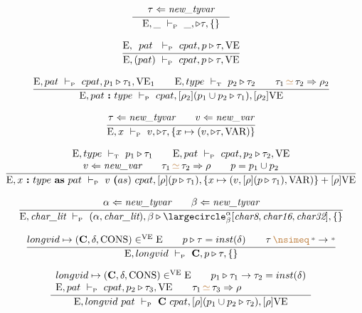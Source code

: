 \documentclass[11pt,a4paper]{article}
\newcommand{\key}[1]{\textrm{\textbf{#1}}}
\newcommand{\overld}[3]{\largecircle^{#1}_{#2}{#3}}
\newcommand{\qualtype}[2]{#1 \triangleright #2}
\newcommand{\unify}[3]{#1\,{\color{brown}{\simeq}}\,#2 \Rightarrow #3}
\newcommand{\notunifiable}[2]{#1\,{\color{brown}{\nsimeq}}\,#2}
\newcommand{\braced}[1]{\{#1\}}
\newcommand{\wildcard}{{\color{gray}\scriptstyle\textbf{*}}}
\newcommand{\litchar}{\textit{char\_lit}}
\newcommand{\Char}[1]{\textit{char#1}}
\newcommand{\Env}  {\textrm{E}}
\newcommand{\VE}   {\textrm{VE}}
\newcommand{\VKC}  {\textrm{CONS}}
\newcommand{\VKV}  {\textrm{VAR}}
\newcommand{\vcon} {\mathbf{C}}
\newcommand{\Empty}{\braced{}}
\newcommand{\vdashP}  {\ \vdash_{\textrm{\tiny P}}\  }
\newcommand{\vdashT}  {\ \vdash_{\textrm{\tiny T}}\  }
\newcommand{\corenew}[1]{\textit{new\_#1}}
\begin{document}
\[
\cfrac
 {\tau \Leftarrow \corenew{tyvar}}
 {\quad\Env, \_ \vdashP \_, \qualtype{}{\tau}, \Empty\quad}
\]

\[
\cfrac
 {\Env,\ \, pat\ \vdashP cpat,\qualtype{p}{\tau},\VE}
 {\Env,(pat) \vdashP cpat,\qualtype{p}{\tau},\VE}
\]

\[
\cfrac
 {\Env,pat \vdashP cpat,\qualtype{p_1}{\tau_1},\VE_1    \qquad
  \Env, type \vdashT \qualtype{p_2}{\tau_2}             \qquad
  \unify{\tau_1}{\tau_2}{\rho_2}}
 {\Env, pat\ \key{:}\ type \vdashP cpat, [\rho_2](\qualtype{p_1 \cup p_2}{\tau_1}), [\rho_2]\VE}
\]

\[
\cfrac
 {\tau \Leftarrow \corenew{tyvar}   \qquad
  v    \Leftarrow \corenew{var}}
 {\Env, x \vdashP v, \qualtype{}{\tau}, \braced{x \mapsto (v, \qualtype{}{\tau}, \VKV)}}
\]

\[
\cfrac
 {\begin{array}{c}
  \Env,type \vdashT \qualtype{p_1}{\tau_1}              \qquad
  \Env,pat \vdashP cpat,\qualtype{p_2}{\tau_2}, \VE     \\
  v   \Leftarrow \corenew{var}                          \qquad  
  \unify{\tau_1}{\tau_2}{\rho}                          \qquad
  p = p_1 \cup p_2
  \end{array}}
 {\Env, x\ \key{:}\ type\ \key{as}\ pat \vdashP 
    v\ \key(as)\ cpat, [\rho](\qualtype{p}{\tau_1}), \braced{x \mapsto (v, [\rho](\qualtype{p}{\tau_1}), \VKV)} + [\rho]\VE}
\]

\[
\cfrac
 {\alpha \Leftarrow \corenew{tyvar} \qquad
  \beta  \Leftarrow \corenew{tyvar}}
 {\Env, \litchar \vdashP (\alpha,\litchar), \qualtype{\beta}{\overld{\alpha}{\beta}{[\Char{8},\Char{16},\Char{32}]}}, \Empty}
\]

\[
\cfrac
 {longvid \mapsto (\vcon, \delta, \VKC) \in^\VE \Env \qquad
  \qualtype{p}{\tau} = inst(\delta)    \qquad
  \notunifiable{\tau}{\wildcard \to \wildcard} }
 {\Env, longvid \vdashP \vcon, \qualtype{p}{\tau}, \Empty}
\]

\[
\cfrac
 {\begin{array}{l}
  longvid \mapsto (\vcon, \delta, \VKC) \in^\VE \Env     \qquad
  \qualtype{p_1}{\tau_1\to\tau_2} = inst(\delta)         \\
  \Env,pat \vdashP cpat, \qualtype{p_2}{\tau_3},\VE      \qquad
  \unify{\tau_1}{\tau_3}{\rho}                           \\
  \end{array}}
 {\Env, longvid\ pat \vdashP \vcon\ cpat, [\rho](\qualtype{p_1 \cup p_2}{\tau_2}), [\rho]\VE}
\]
\end{document}
